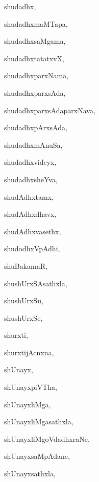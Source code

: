\begin{multicols}{3}
{\noindent
{shudadhx}, \pageref{shudadhx}

\noindent
{shudadhxmaMTapa}, \pageref{shudadhxmaMTapa}

\noindent
{shudadhxsaMgama}, \pageref{shudadhxsaMgama}

\noindent
{shudadhxtatatxvX}, \pageref{shudadhxtatatxvX}

\noindent
{shudadhxparxNama}, \pageref{shudadhxparxNama}

\noindent
{shudadhxparxsAda}, \pageref{shudadhxparxsAda}

\noindent
{shudadhxparxsAdaparxNava}, \pageref{shudadhxparxsAdaparxNava}

\noindent
{shudadhxpArxsAda}, \pageref{shudadhxpArxsAda}

\noindent
{shudadhxmAnuSa}, \pageref{shudadhxmAnuSa}

\noindent
{shudadhxvideyx}, \pageref{shudadhxvideyx}

\noindent
{shudadhxsheYva}, \pageref{shudadhxsheYva}

\noindent
{shudAdhxtamx}, \pageref{shudAdhxtamx}

\noindent
{shudAdhxdhavx}, \pageref{shudAdhxdhavx}

\noindent
{shudAdhxvasethx}, \pageref{shudAdhxvasethx}

\noindent
{shudodhxVpAdhi}, \pageref{shudodhxVpAdhi}

\noindent
{shuBakamaR}, \pageref{shuBakamaR}

\noindent
{shushUrxSAsathxla}, \pageref{shushUrxSAsathxla}

\noindent
{shushUrxSu}, \pageref{shushUrxSu}

\noindent
{shushUrxSe}, \pageref{shushUrxSe}

\noindent
{shurxti}, \pageref{shurxti}

\noindent
{shurxtijAcnxna}, \pageref{shurxtijAcnxna}

\noindent
{shUnayx}, \pageref{shUnayx}

\noindent
{shUnayxpiVTha}, \pageref{shUnayxpiVTha}

\noindent
{shUnayxliMga}, \pageref{shUnayxliMga}

\noindent
{shUnayxliMgasathxla}, \pageref{shUnayxliMgasathxla}

\noindent
{shUnayxliMgoVdadhxraNe}, \pageref{shUnayxliMgoVdadhxraNe}

\noindent
{shUnayxsaMpAdane}, \pageref{shUnayxsaMpAdane}

\noindent
{shUnayxsathxla}, \pageref{shUnayxsathxla}

}
\end{multicols}
